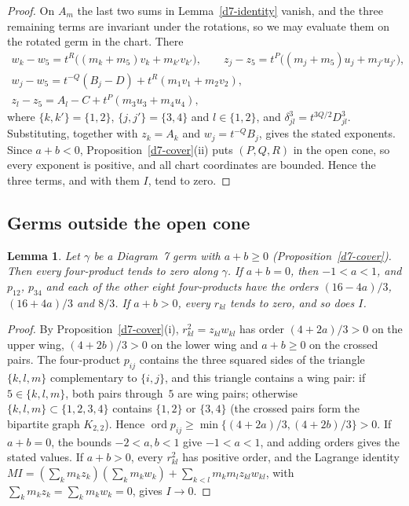 \documentclass[11pt]{amsart}
\newtheorem{lemma}[theorem]{Lemma}
\theoremstyle{definition}
\theoremstyle{remark}
\newcommand{\ord}{\operatorname{ord}}
\begin{document}
\begin{proof}
On $A_m$ the last two sums in Lemma~\ref{d7-identity} vanish, and the three remaining terms are
invariant under the rotations, so we may evaluate them on the rotated germ in the chart.  There
\begin{gather*}
  w_k-w_5=t^R\bigl((m_k+m_5)v_k+m_{k'}v_{k'}\bigr),\qquad
  z_j-z_5=t^P\bigl((m_j+m_5)u_j+m_{j'}u_{j'}\bigr),\\
  w_j-w_5=t^{-Q}(B_j-D)+t^R(m_1v_1+m_2v_2),\\
  z_l-z_5=A_l-C+t^P(m_3u_3+m_4u_4),
\end{gather*}
where $\{k,k'\}=\{1,2\}$, $\{j,j'\}=\{3,4\}$ and $l\in\{1,2\}$, and
$\delta_{jl}^3=t^{3Q/2}D_{jl}^3$.  Substituting, together with $z_k=A_k$ and $w_j=t^{-Q}B_j$,
gives the stated exponents.  Since $a+b<0$, Proposition~\ref{d7-cover}(ii) puts $(P,Q,R)$ in the
open cone, so every exponent is positive, and all chart coordinates are bounded.  Hence the three
terms, and with them $I$, tend to zero.
\end{proof}

\subsection{Germs outside the open cone}

\begin{lemma}\label{d7-bounded}
Let $\gamma$ be a Diagram~7 germ with $a+b\ge0$ (Proposition~\ref{d7-cover}).  Then every
four-product tends to zero along $\gamma$.  If $a+b=0$, then $-1<a<1$, and $p_{12}$, $p_{34}$
and each of the other eight four-products have the orders $(16-4a)/3$, $(16+4a)/3$ and $8/3$.
If $a+b>0$, every $r_{kl}$ tends to zero, and so does $I$.
\end{lemma}

\begin{proof}
By Proposition~\ref{d7-cover}(i), $r_{kl}^2=z_{kl}w_{kl}$ has order $(4+2a)/3>0$ on the upper
wing, $(4+2b)/3>0$ on the lower wing and $a+b\ge0$ on the crossed pairs.  The four-product
$p_{ij}$ contains the three squared sides of the triangle $\{k,l,m\}$ complementary to
$\{i,j\}$, and this triangle contains a wing pair: if $5\in\{k,l,m\}$, both pairs through~$5$
are wing pairs; otherwise $\{k,l,m\}\subset\{1,2,3,4\}$ contains $\{1,2\}$ or $\{3,4\}$ (the
crossed pairs form the bipartite graph $K_{2,2}$).  Hence
$\ord p_{ij}\ge\min\{(4+2a)/3,(4+2b)/3\}>0$.  If $a+b=0$, the bounds $-2<a,b<1$ give $-1<a<1$,
and adding orders gives the stated values.  If $a+b>0$, every $r_{kl}^2$ has positive order, and
the Lagrange identity $MI=(\sum_km_kz_k)(\sum_km_kw_k)+\sum_{k<l}m_km_lz_{kl}w_{kl}$, with
$\sum_km_kz_k=\sum_km_kw_k=0$, gives $I\to0$.
\end{proof}
\end{document}
